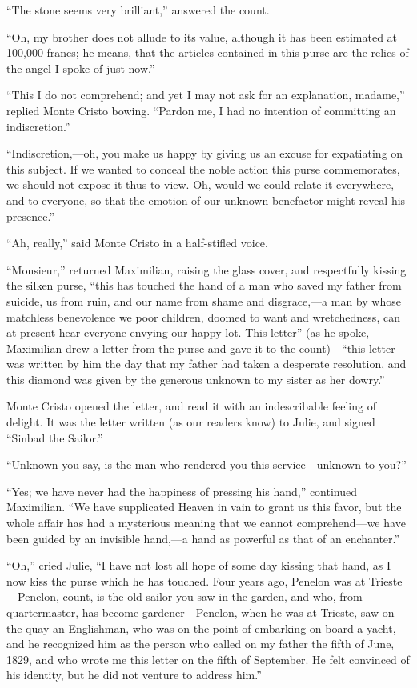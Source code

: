 “The stone seems very brilliant,” answered the count.

“Oh, my brother does not allude to its value, although it has been
estimated at 100,000 francs; he means, that the articles contained in
this purse are the relics of the angel I spoke of just now.”

“This I do not comprehend; and yet I may not ask for an explanation,
madame,” replied Monte Cristo bowing. “Pardon me, I had no intention of
committing an indiscretion.”

“Indiscretion,—oh, you make us happy by giving us an excuse for
expatiating on this subject. If we wanted to conceal the noble action
this purse commemorates, we should not expose it thus to view. Oh,
would we could relate it everywhere, and to everyone, so that the
emotion of our unknown benefactor might reveal his presence.”

“Ah, really,” said Monte Cristo in a half-stifled voice.

“Monsieur,” returned Maximilian, raising the glass cover, and
respectfully kissing the silken purse, “this has touched the hand of a
man who saved my father from suicide, us from ruin, and our name from
shame and disgrace,—a man by whose matchless benevolence we poor
children, doomed to want and wretchedness, can at present hear everyone
envying our happy lot. This letter” (as he spoke, Maximilian drew a
letter from the purse and gave it to the count)—“this letter was
written by him the day that my father had taken a desperate resolution,
and this diamond was given by the generous unknown to my sister as her
dowry.”

Monte Cristo opened the letter, and read it with an indescribable
feeling of delight. It was the letter written (as our readers know) to
Julie, and signed “Sinbad the Sailor.”

“Unknown you say, is the man who rendered you this service—unknown to
you?”

“Yes; we have never had the happiness of pressing his hand,” continued
Maximilian. “We have supplicated Heaven in vain to grant us this favor,
but the whole affair has had a mysterious meaning that we cannot
comprehend—we have been guided by an invisible hand,—a hand as powerful
as that of an enchanter.”

“Oh,” cried Julie, “I have not lost all hope of some day kissing that
hand, as I now kiss the purse which he has touched. Four years ago,
Penelon was at Trieste—Penelon, count, is the old sailor you saw in the
garden, and who, from quartermaster, has become gardener—Penelon, when
he was at Trieste, saw on the quay an Englishman, who was on the point
of embarking on board a yacht, and he recognized him as the person who
called on my father the fifth of June, 1829, and who wrote me this
letter on the fifth of September. He felt convinced of his identity,
but he did not venture to address him.”

